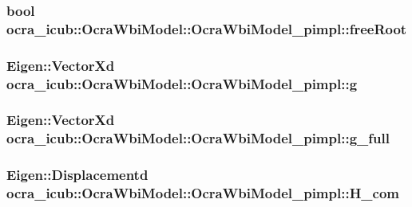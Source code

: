 \hypertarget{structOcraWbiModel_1_1OcraWbiModel__pimpl_ac779ed6d908a6e1773ce4be340bd8182}{
\subsubsection[{free\-Root}]{\setlength{\rightskip}{0pt plus 5cm}bool {\bf ocra\-\_\-icub\-::\-Ocra\-Wbi\-Model\-::\-Ocra\-Wbi\-Model\-\_\-pimpl\-::free\-Root}}}\label{structOcraWbiModel_1_1OcraWbiModel__pimpl_ac779ed6d908a6e1773ce4be340bd8182}
\hypertarget{structOcraWbiModel_1_1OcraWbiModel__pimpl_ac9a96e0afe19e395bfadf4a21b6d0f5b}{
\subsubsection[{g}]{\setlength{\rightskip}{0pt plus 5cm}\-Eigen\-::\-Vector\-Xd {\bf ocra\-\_\-icub\-::\-Ocra\-Wbi\-Model\-::\-Ocra\-Wbi\-Model\-\_\-pimpl\-::g}}}\label{structOcraWbiModel_1_1OcraWbiModel__pimpl_ac9a96e0afe19e395bfadf4a21b6d0f5b}
\hypertarget{structOcraWbiModel_1_1OcraWbiModel__pimpl_a76adc7eb17d82f9234a4f130c2712be5}{
\subsubsection[{g\-\_\-full}]{\setlength{\rightskip}{0pt plus 5cm}\-Eigen\-::\-Vector\-Xd {\bf ocra\-\_\-icub\-::\-Ocra\-Wbi\-Model\-::\-Ocra\-Wbi\-Model\-\_\-pimpl\-::g\-\_\-full}}}\label{structOcraWbiModel_1_1OcraWbiModel__pimpl_a76adc7eb17d82f9234a4f130c2712be5}
\hypertarget{structOcraWbiModel_1_1OcraWbiModel__pimpl_a5e031088136b048a403c9df06e62c2b8}{
\subsubsection[{\-H\-\_\-com}]{\setlength{\rightskip}{0pt plus 5cm}\-Eigen\-::\-Displacementd {\bf ocra\-\_\-icub\-::\-Ocra\-Wbi\-Model\-::\-Ocra\-Wbi\-Model\-\_\-pimpl\-::\-H\-\_\-com}}}\label{structOcraWbiModel_1_1OcraWbiModel__pimpl_a5e031088136b048a403c9df06e62c2b8}
